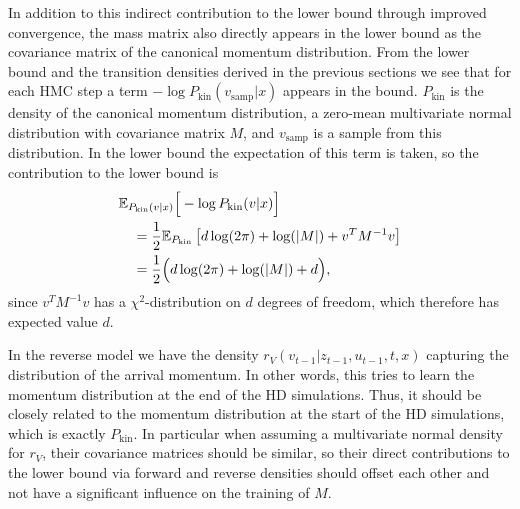 In addition to this indirect contribution to the lower bound through improved convergence, the mass matrix also directly appears in the lower bound as the covariance matrix of the canonical momentum distribution. From the lower bound and the transition densities derived in the previous sections we see that for each HMC step a term $-\log P_\textrm{kin}(v_\textrm{samp}|x)$ appears in the bound. $P_\textrm{kin}$ is the density of the canonical momentum distribution, a zero-mean multivariate normal distribution with covariance matrix $M$, and $v_\textrm{samp}$ is a sample from this distribution. In the lower bound the expectation of this term is taken, so the contribution to the lower bound is
\begin{equation}
\begin{split}
&\mathbb{E}_{P_\textrm{kin}(v|x)} \Big[ -\log P_\textrm{kin}(v|x) \Big] \\
&\quad= \frac{1}{2}\mathbb{E}_{P_\textrm{kin}} \left[d\log(2 \pi) + \log(|M|) +  v^T M^{-1} v \right] \\
&\quad= \frac{1}{2} \Big( d \log(2 \pi) + \log(|M|) + d \Big), 
\end{split}
\end{equation}
since $v^T M^{-1} v$ has a $\chi^2$-distribution on $d$ degrees of freedom, which therefore has expected value $d$. 

%
In the reverse model we have the density $r_V(v_{t-1}|z_{t-1}, u_{t-1}, t, x)$ capturing the distribution of the arrival momentum. In other words, this tries to learn the momentum distribution at the end of the HD simulations. Thus, it should be closely related to the momentum distribution at the start of the HD simulations, which is exactly $P_\textrm{kin}$. In particular when assuming a multivariate normal density for $r_V$, their covariance matrices should be similar, so their direct contributions to the lower bound via forward and reverse densities should offset each other and not have a significant influence on the training of $M$.

